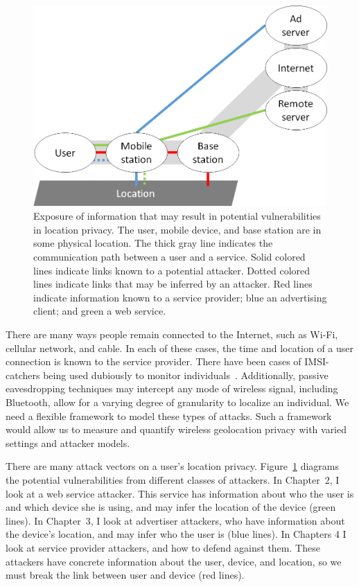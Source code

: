 \begin{figure}\begin{center}
	\includegraphics[width=\textwidth]{graphics/attacks}
	\caption{Exposure of information that may result in potential vulnerabilities in location privacy. The user, mobile device, and base station are in some physical location. The thick gray line indicates the communication path between a user and a service. Solid colored lines indicate links known to a potential attacker. Dotted colored lines indicate links that may be inferred by an attacker. Red lines indicate information known to a service provider; blue an advertising client; and green a web service.}
	\label{fig:overview}
\end{center}\end{figure}

There are many ways people remain connected to the Internet, such as Wi-Fi, cellular network, and cable. In each of these cases, the time and location of a user connection is known to the service provider. There have been cases of IMSI-catchers being used dubiously to monitor individuals~\cite{dabrowski2014imsi}. Additionally, passive eavesdropping techniques may intercept any mode of wireless signal, including Bluetooth, allow for a varying degree of granularity to localize an individual. We need a flexible framework to model these types of attacks. Such a framework would allow us to measure and quantify wireless geolocation privacy with varied settings and attacker models. 

There are many attack vectors on a user's location privacy. Figure~\ref{fig:overview} diagrams the potential vulnerabilities from different classes of attackers. In Chapter~2, I look at a web service attacker. This service has information about who the user is and which device she is using, and may infer the location of the device (green lines). In Chapter~3, I look at advertiser attackers, who have information about the device's location, and may infer who the user is (blue lines). In Chapters 4 I look at service provider attackers, and how to defend against them. These attackers have concrete information about the user, device, and location, so we must break the link between user and device (red lines). 

